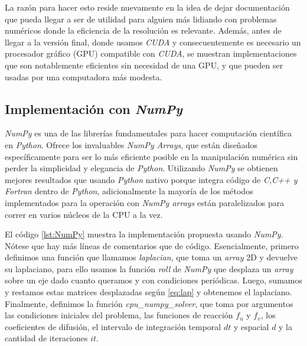La razón para hacer esto reside nuevamente en la idea de dejar documentación que pueda llegar a ser de utilidad para alguien más lidiando 
con problemas numéricos donde la eficiencia de la resolución es relevante. Además, antes de llegar a la versión final, donde usamos \textit{CUDA} y 
consecuentemente es necesario un procesador gráfico (GPU) compatible con \textit{CUDA}, se muestran implementaciones que son notablemente eficientes sin necesidad 
de una GPU, y que pueden ser usadas por una computadora más modesta.

\subsection{Implementación con \textit{NumPy}}
\label{SS:NumPy}
\textit{NumPy} es una de las librerías fundamentales para hacer computación científica en \textit{Python}. Ofrece los invaluables \textit{NumPy Arrays}, que están diseñados 
específicamente para ser lo más eficiente posible en la manipulación numérica sin perder la simplicidad y elegancia de \textit{Python}. Utilizando \textit{NumPy} 
se obtienen mejores resultados que usando \textit{Python} nativo porque integra código de \textit{C,C++ y Fortran} dentro de \textit{Python}, adicionalmente la mayoría 
de los métodos implementados para la operación con \textit{NumPy arrays} están paralelizados para correr en varios núcleos de la CPU a la vez.

El código \ref{lst:NumPy} muestra la implementación propuesta usando \textit{NumPy}. Nótese que hay más líneas de comentarios que de código. Esencialmente, 
primero definimos una función que llamamos \textit{laplacian}, que toma un \textit{array} 2D 
y devuelve su laplaciano, para ello usamos la función \textit{roll} de \textit{NumPy} que desplaza un \textit{array} sobre un eje dado
cuanto queramos y con condiciones periódicas.
Luego, sumamos y restamos estas matrices desplazadas según \ref{eq:lap} y obtenemos el laplaciano. Finalmente, definimos la función \textit{cpu\_numpy\_solver}, que toma 
por argumentos las condiciones iniciales del problema, las funciones de reacción $f_u$ y $f_v$, los coeficientes de difusión, 
el intervalo de integración temporal $dt$ y espacial $d$ y la cantidad de iteraciones $it$. 

